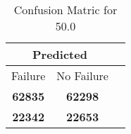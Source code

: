 \begin{table}[] 
\label{Table: Prediction Accuracy-DMD50.0OnlySunEKF-resetReflection-Reflection} 
\caption{Confusion Matric for 50.0} 
\centering 
\begin{tabular} 
 {@{}ccc@{}} 
\toprule 
\multicolumn{2}{c}{\textbf{Predicted}}
 \\ \midrule 
\multicolumn{1}{|c|}{Failure} & 
\multicolumn{1}{c|}{No Failure}
 \\ \midrule 
\multicolumn{1}{|c|}{\color{green}\textbf{62835}} & 
\multicolumn{1}{c|}{\color{green}\textbf{62298}}
 \\ \midrule 
\multicolumn{1}{|c|}{\color{red}\textbf{22342}} & 
\multicolumn{1}{c|}{\color{red}\textbf{22653}}
 \\ \bottomrule 
\end{tabular} 
\end{table} 
